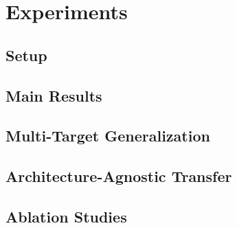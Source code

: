 \section{Experiments}
\label{sec:experiments}



\subsection{Setup}
\label{sec:setup}

\subsection{Main Results}
\label{sec:main_results}

\subsection{Multi-Target Generalization}
\label{sec:multi_source}

\subsection{Architecture-Agnostic Transfer}
\label{sec:mas}

\subsection{Ablation Studies}
\label{sec:ablations}

